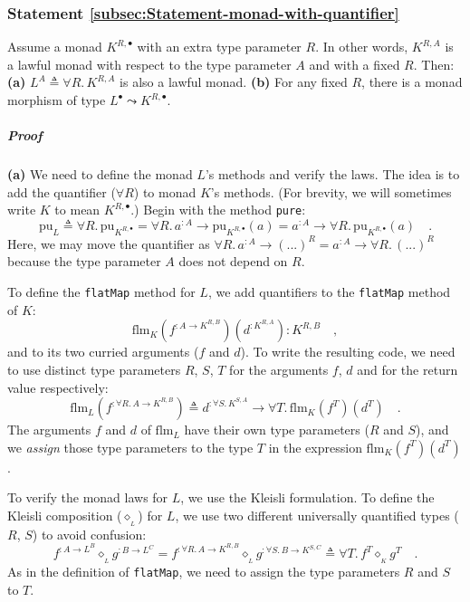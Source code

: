 \subsubsection{Statement \label{subsec:Statement-monad-with-quantifier}\ref{subsec:Statement-monad-with-quantifier}}

Assume a monad $K^{R,\bullet}$ with an extra type parameter $R$.
In other words, $K^{R,A}$ is a lawful monad with respect to the type
parameter $A$ and with a fixed $R$. Then: \textbf{(a)} $L^{A}\triangleq\forall R.\,K^{R,A}$
is also a lawful monad. \textbf{(b)} For any fixed $R$, there is
a monad morphism of type $L^{\bullet}\leadsto K^{R,\bullet}$.

\subparagraph{Proof}

\textbf{(a)} We need to define the monad $L$\textsf{'}s methods and verify
the laws. The idea is to add the quantifier ($\forall R$) to monad
$K$\textsf{'}s methods. (For brevity, we will sometimes write $K$ to mean
$K^{R,\bullet}$.) Begin with the method \lstinline!pure!:
\[
\text{pu}_{L}\triangleq\forall R.\,\text{pu}_{K^{R,\bullet}}=\forall R.\,a^{:A}\rightarrow\text{pu}_{K^{R,\bullet}}(a)=a^{:A}\rightarrow\forall R.\,\text{pu}_{K^{R,\bullet}}(a)\quad.
\]
Here, we may move the quantifier as $\forall R.\,a^{:A}\rightarrow(...)^{R}=a^{:A}\rightarrow\forall R.\,(...)^{R}$
because the type parameter $A$ does not depend on $R$.

To define the \lstinline!flatMap! method for $L$, we add quantifiers
to the \lstinline!flatMap! method of $K$:
\[
\text{flm}_{K}(f^{:A\rightarrow K^{R,B}})(d^{:K^{R,A}}):K^{R,B}\quad,
\]
and to its two curried arguments ($f$ and $d$). To write the resulting
code, we need to use distinct type parameters $R$, $S$, $T$ for
the arguments $f$, $d$ and for the return value respectively: 
\[
\text{flm}_{L}(f^{:\forall R.\,A\rightarrow K^{R,B}})\triangleq d^{:\forall S.\,K^{S,A}}\rightarrow\forall T.\,\text{flm}_{K}(f^{T})(d^{T})\quad.
\]
The arguments $f$ and $d$ of $\text{flm}_{L}$ have their own type
parameters ($R$ and $S$), and we \emph{assign} those type parameters
to the type $T$ in the expression $\text{flm}_{K}(f^{T})(d^{T})$.

To verify the monad laws for $L$, we use the Kleisli formulation.
To define the Kleisli composition ($\diamond_{_{L}}$) for $L$, we
use two different universally quantified types ($R$, $S$) to avoid
confusion:
\[
f^{:A\rightarrow L^{B}}\diamond_{_{L}}g^{:B\rightarrow L^{C}}=f^{:\forall R.\,A\rightarrow K^{R,B}}\diamond_{_{L}}g^{:\forall S.\,B\rightarrow K^{S,C}}\triangleq\forall T.\,f^{T}\diamond_{_{K}}g^{T}\quad.
\]
As in the definition of \lstinline!flatMap!, we need to assign the
type parameters $R$ and $S$ to $T$. 

